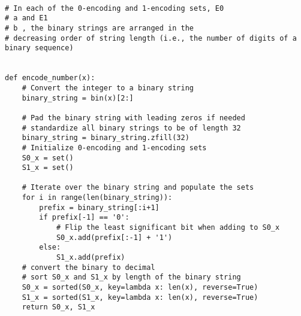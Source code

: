 \begin{lstlisting}[style=mystyle, caption={Encode Number Function}, label=yourlabel]

# In each of the 0-encoding and 1-encoding sets, E0
# a and E1
# b , the binary strings are arranged in the
# decreasing order of string length (i.e., the number of digits of a binary sequence)


def encode_number(x):
    # Convert the integer to a binary string
    binary_string = bin(x)[2:]

    # Pad the binary string with leading zeros if needed
    # standardize all binary strings to be of length 32
    binary_string = binary_string.zfill(32)
    # Initialize 0-encoding and 1-encoding sets
    S0_x = set()
    S1_x = set()

    # Iterate over the binary string and populate the sets
    for i in range(len(binary_string)):
        prefix = binary_string[:i+1]
        if prefix[-1] == '0':
            # Flip the least significant bit when adding to S0_x
            S0_x.add(prefix[:-1] + '1')
        else:
            S1_x.add(prefix)
    # convert the binary to decimal
    # sort S0_x and S1_x by length of the binary string
    S0_x = sorted(S0_x, key=lambda x: len(x), reverse=True)
    S1_x = sorted(S1_x, key=lambda x: len(x), reverse=True)
    return S0_x, S1_x

\end{lstlisting}



